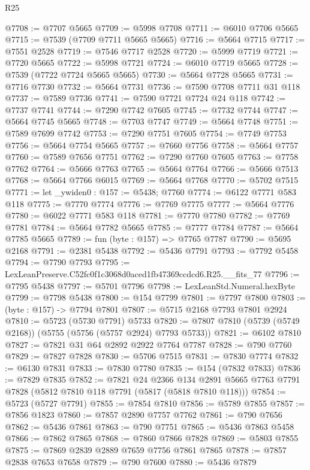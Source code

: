 \begin{lexlean}{R25}
\begin{coremodule}
@7708 := @7707 @5665
@7709 := @5998 @7708
@7711 := @6010 @7706 @5665
@7715 := @7539 (@7709 @7711 @5665 @5665)
@7716 := @5664 @7715
@7717 := @7551 @2528
@7719 := @7546 @7717 @2528
@7720 := @5999 @7719
@7721 := @7720 @5665
@7722 := @5998 @7721
@7724 := @6010 @7719 @5665
@7728 := @7539 (@7722 @7724 @5665 @5665)
@7730 := @5664 @7728 @5665
@7731 := @7716 @7730
@7732 := @5664 @7731
@7736 := @7590 @7708 @7711 @31 @118
@7737 := @7589 @7736
@7741 := @7590 @7721 @7724 @24 @118
@7742 := @7737 @7741
@7744 := @7290 @7742 @7605
@7745 := @7732 @7744
@7747 := @5664 @7745 @5665
@7748 := @7703 @7747
@7749 := @5664 @7748
@7751 := @7589 @7699 @7742
@7753 := @7290 @7751 @7605
@7754 := @7749 @7753
@7756 := @5664 @7754 @5665
@7757 := @7660 @7756
@7758 := @5664 @7757
@7760 := @7589 @7656 @7751
@7762 := @7290 @7760 @7605
@7763 := @7758 @7762
@7764 := @5666 @7763
@7765 := @5664 @7764
@7766 := @5666 @7513
@7768 := @5664 @7766 @6015
@7769 := @5664 @7768
@7770 := @5702 @7515
@7771 := let _ywiden0 : @157 := @5438; @7760
@7774 := @6122 @7771 @583 @118
@7775 := @7770 @7774
@7776 := @7769 @7775
@7777 := @5664 @7776
@7780 := @6022 @7771 @583 @118
@7781 := @7770 @7780
@7782 := @7769 @7781
@7784 := @5664 @7782 @5665
@7785 := @7777 @7784
@7787 := @5664 @7785 @5665
@7789 := fun (byte : @157) => @7765 @7787
@7790 := @5695 @2168
@7791 := @2381 @5438
@7792 := @5436 @7791
@7793 := @7792 @5458
@7794 := @7790 @7793
@7795 := LexLeanPreserve.C52fc0f1c3068d0aced1fb47369ccdcd6.R25.__fits_77
@7796 := @7795 @5438
@7797 := @5701 @7796
@7798 := LexLeanStd.Numeral.hexByte
@7799 := @7798 @5438
@7800 := @154 @7799
@7801 := @7797 @7800
@7803 := (byte : @157) -> @7794 @7801
@7807 := @5715 @2168 @7793 @7801 @2924
@7810 := @5723 (@5730 @7791) @5733
@7820 := @7807 @7810 (@5739 (@5749 @2168)) (@5755 (@5756 (@5757 @2924) @7793 @5733))
@7821 := @6102 @7810
@7827 := @7821 @31 @64 @2892 @2922 @7764 @7787
@7828 := @790 @7760
@7829 := @7827 @7828
@7830 := @5706 @7515
@7831 := @7830 @7774
@7832 := @6130 @7831
@7833 := @7830 @7780
@7835 := @154 (@7832 @7833)
@7836 := @7829 @7835
@7852 := @7821
    @24
    @2366
    @134
    @2891
    @5665
    @7763
    @7791
    @7828
    (@5812 @7810 @118 @7791 (@5817 (@5818 @7810 @118)))
@7854 := @5723 (@5727 @7791)
@7855 := @7854 @7810
@7856 := @5789 @7855
@7857 := @7856 @1823
@7860 := @7857 @2890 @7757 @7762
@7861 := @790 @7656
@7862 := @5436 @7861
@7863 := @790 @7751
@7865 := @5436 @7863 @5458
@7866 := @7862 @7865
@7868 := @7860 @7866 @7828
@7869 := @5803 @7855
@7875 := @7869 @2839 @2889 @7659 @7756 @7861 @7865
@7878 := @7857 @2838 @7653 @7658
@7879 := @790 @7600
@7880 := @5436 @7879

\end{coremodule}
\end{lexlean}
